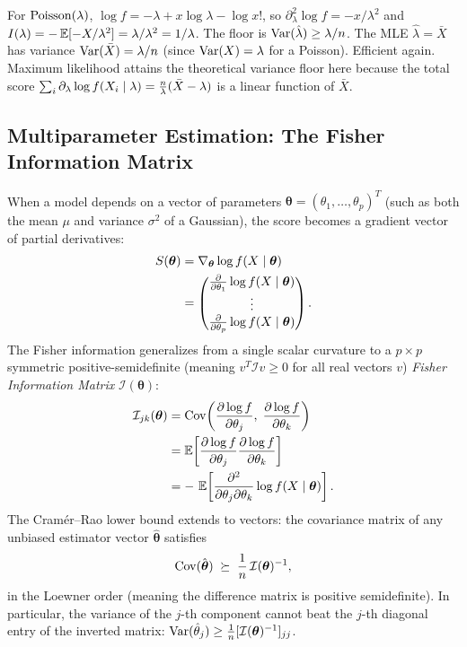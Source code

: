 \begin{example}
\label{ch30:ex-crlb-pois}
For $\operatorname{Poisson}(\lambda)$, $\log f = -\lambda + x\log\lambda - \log x!$, so
$\partial_\lambda^2 \log f = -x/\lambda^2$ and
$I(\lambda) = -\operatorname{\mathbb{E}}[-X/\lambda^2] = \lambda/\lambda^2 = 1/\lambda$. The floor is
$\operatorname{Var}(\hat\lambda)\ge \lambda/n$. The MLE $\hat\lambda=\bar X$ has variance
$\operatorname{Var}(\bar X)=\lambda/n$ (since $\operatorname{Var}(X)=\lambda$ for a Poisson). Efficient
again. Maximum likelihood attains the theoretical variance floor here because the total score $\sum_i \partial_\lambda \log f(X_i \mid \lambda) = \frac{n}{\lambda}(\bar X - \lambda)$ is a linear function of $\bar X$.
\end{example}

\subsection{Multiparameter Estimation: The Fisher Information Matrix}
When a model depends on a vector of parameters $\bm\theta = (\theta_1, \dots, \theta_p)^T$ (such as both the mean $\mu$ and variance $\sigma^2$ of a Gaussian), the score becomes a gradient vector of partial derivatives:
\begin{align*}
  S(\boldsymbol\theta) &= \nabla_{\boldsymbol\theta} \log f(X \mid \boldsymbol\theta) \\
  &= \begin{pmatrix} \frac{\partial}{\partial \theta_1} \log f(X\mid\boldsymbol\theta) \\ \vdots \\ \frac{\partial}{\partial \theta_p} \log f(X\mid\boldsymbol\theta) \end{pmatrix}.
\end{align*}
The Fisher information generalizes from a single scalar curvature to a $p \times p$ symmetric positive-semidefinite (meaning $v^T \mathcal{I} v \ge 0$ for all real vectors $v$) \emph{Fisher Information Matrix} $\mathcal{I}(\bm\theta)$:
\begin{align*}
  \mathcal{I}_{jk}(\boldsymbol\theta)
  &= \operatorname{Cov}\!\left( \frac{\partial \log f}{\partial \theta_j},\; \frac{\partial \log f}{\partial \theta_k} \right) \\
  &= \operatorname{\mathbb{E}}\!\left[ \frac{\partial \log f}{\partial \theta_j} \frac{\partial \log f}{\partial \theta_k} \right] \\
  &= -\,\operatorname{\mathbb{E}}\!\left[ \frac{\partial^2}{\partial \theta_j \partial \theta_k} \log f(X\mid\boldsymbol\theta) \right].
\end{align*}
The Cram\'er--Rao lower bound extends to vectors: the covariance matrix of any unbiased estimator vector $\hat{\bm\theta}$ satisfies
\[
  \operatorname{Cov}(\hat{\boldsymbol\theta}) \;\succeq\; \frac{1}{n}\,\mathcal{I}(\boldsymbol\theta)^{-1},
\]
in the Loewner order (meaning the difference matrix is positive semidefinite). In particular, the variance of the $j$-th component cannot beat the $j$-th diagonal entry of the inverted matrix: $\operatorname{Var}(\hat\theta_j) \ge \frac{1}{n} [\mathcal{I}(\boldsymbol\theta)^{-1}]_{jj}$.

